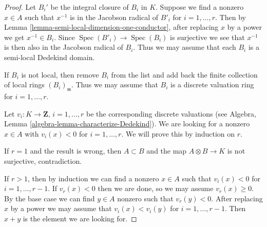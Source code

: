 \documentclass[10pt,a4paper]{amsart}
\theoremstyle{plain}
\theoremstyle{definition}
\theoremstyle{remark}
\numberwithin{equation}{subsection}
\def\Spec{\mathop{\mathrm{Spec}}}
\begin{document}
\begin{proof}
Let $B_i'$ be the integral closure of $B_i$ in $K$. Suppose we find a
nonzero $x \in A$ such that $x^{-1}$ is in the Jacobson radical of $B'_i$ for
$i = 1, \ldots, r$. Then by
Lemma \ref{lemma-semi-local-dimension-one-conductor},
after replacing $x$ by a power we get $x^{-1} \in B_i$.
Since $\Spec(B'_i) \to \Spec(B_i)$ is surjective we
see that $x^{-1}$ is then also in the Jacobson radical of $B_i$.
Thus we may assume that each $B_i$ is a semi-local Dedekind domain.

\medskip\noindent
If $B_i$ is not local, then remove $B_i$ from the list and
add back the finite collection of local rings $(B_i)_\mathfrak m$.
Thus we may assume that $B_i$ is a discrete valuation ring for
$i = 1, \ldots, r$.

\medskip\noindent
Let $v_i : K \to \mathbf{Z}$, $i = 1, \ldots, r$
be the corresponding discrete valuations (see
Algebra, Lemma \ref{algebra-lemma-characterize-Dedekind}).
We are looking for a nonzero $x \in A$ with $v_i(x) < 0$ for
$i = 1, \ldots, r$. We will prove this by induction on $r$.

\medskip\noindent
If $r = 1$ and the result is wrong, then $A \subset B$ and the map
$A \otimes B \to K$ is not surjective, contradiction.

\medskip\noindent
If $r > 1$, then by induction we can find a nonzero $x \in A$ such that
$v_i(x) < 0$ for $i = 1, \ldots, r - 1$. If $v_r(x) < 0$ then we are
done, so we may assume $v_r(x) \geq 0$. By the base case we can find
$y \in A$ nonzero such that $v_r(y) < 0$. After replacing $x$ by a
power we may assume that $v_i(x) < v_i(y)$ for $i = 1, \ldots, r - 1$.
Then $x + y$ is the element we are looking for.
\end{proof}
\end{document}
